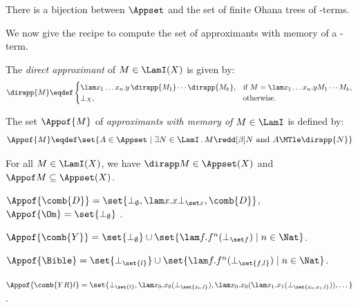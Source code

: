 \setcounter{lem:bijAppsetfinmemtrees}{\thetheorem}
\begin{lemma}
\label{lem:bijAppset_finmemtrees}\label{lem:bijAppsetfinmemtrees}
There is a bijection between $\Appset$ and the set of finite Ohana trees of \lamI-terms.
\end{lemma}

We now give the recipe to compute the set of approximants with memory of a \lamI-term.

\begin{definition}\mbox{}
\bsub
\item The \emph{direct approximant} of $M\in\LamI(X)$ is given by:
\[
	\dirapp{M} \eqdef 
	\begin{cases}
	 \lam x_1\ldots x_n.y\,\dirapp{M_1}\cdots \dirapp{M_k},&\textrm{if }M = \lam x_1\ldots x_n.yM_1\cdots M_k,\\	
	\bot_X,&\textrm{otherwise.}
	\end{cases}
\]
\item The set $\Appof{M}$ of \emph{approximants with memory of $M\in\LamI$} is defined by:
\[
	\Appof{M} \eqdef \set{ A\in\Appset \mid \exists N\in\LamI\,.\, M\redd[\beta]N \textrm{ and }A\MTle \dirapp{N}}
\]
\esub
\end{definition}

\begin{remark} \label{rem:appof-M-fv-M}
	For all $M \in \LamI(X)$, we have $\dirapp M \in \Appset(X)$ and $\Appof M \subseteq \Appset(X)$.
\end{remark}

\begin{example}\mbox{}
\bsub
\item $\Appof{\comb{D}} = \set{\bot_\emptyset, \lam x.x\bot_{\set x}, 
		\comb{D}}$, 
	$\Appof{\Om} = \set{\bot_{\emptyset}}$%
	.
\item $\Appof{\comb{Y}} = \set{\bot_\emptyset} \cup 
		\set{ \lam f.f^n(\bot_{\set f}) \mid n\in\Nat} $.
\item $\Appof{\Bible} = \set{\bot_{\set{l}}} \cup 
		\set{ \lam f.f^n(\bot_{\set{f,l}}) \mid n\in\Nat} $.
\item $\Appof{\comb{YR}l} = \set{\bot_{\set{l}},
	\lam x_0.x_0(\bot_{\set{x_0,l}}),
	\lam x_0.x_0(\lam x_1.x_1(\bot_{\set{x_0,x_1,l}})), \dots}$.
\esub
\end{example}

